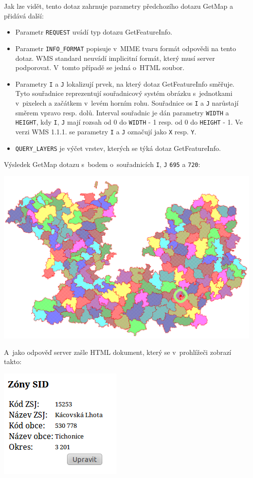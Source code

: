 \documentclass[a4paper,12pt]{article}
\begin{document}
Jak lze vidět, tento dotaz zahrnuje parametry předchozího dotazu
GetMap a přidává další:
\begin{itemize}
  \item Parametr {\tt REQUEST} uvádí typ dotazu GetFeatureInfo.
  \item Parametr {\tt INFO\_FORMAT} popisuje v~MIME tvaru formát odpovědi na tento dotaz. WMS standard neuvádí implicitní formát, který musí server podporovat. V~tomto případě se jedná o~HTML soubor. 
  \item Parametry {\tt I} a {\tt J} lokalizují prvek, na který dotaz GetFeatureInfo směřuje. Tyto souřadnice reprezentují souřadnicový systém obrázku s~jednotkami v~pixelech a začátkem v~levém horním rohu. Souřadnice os {\tt I} a {\tt J} narůstají  
        směrem vpravo resp. dolů. Interval souřadnic je dán parametry {\tt WIDTH} a {\tt HEIGHT}, kdy {\tt I}, {\tt J} mají rozsah od 0 do {\tt WIDTH} - 1 resp. od 0 do {\tt HEIGHT} - 1. Ve verzi WMS 1.1.1. se parametry  
         {\tt I} a {\tt J} označují jako {\tt X} resp. {\tt Y}.
  \item {\tt QUERY\_LAYERS} je výčet vrstev, kterých se týká dotaz GetFeatureInfo. 
\end{itemize}

  Výsledek GetMap dotazu s~bodem o~souřadnicích {\tt I}, {\tt J}  {\tt 695} a {\tt 720}:

\begin{center}
 \includegraphics[scale=0.3]{figures/getfeatureinfo}
\end{center}

\newpage
A~jako odpověď server zašle HTML dokument, který se v~prohlížeči
zobrazí takto:
\begin{center}
 \includegraphics[scale=0.7]{figures/getfeatureinforeply}
\end{center}
\end{document}
